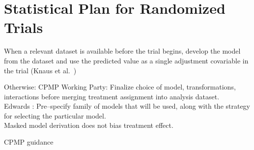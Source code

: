\section{Statistical Plan for Randomized Trials}
\bi
\item   When a relevant dataset is available before the trial begins, develop the model from the dataset and use the predicted value as a single adjustment covariable in the trial (Knaus et al.~\cite{kna93cli})
\item   Otherwise: CPMP Working Party: Finalize choice of model, transformations, interactions before merging treatment assignment into analysis dataset. \\
        Edwards \cite{edw99mod}: Pre--specify family of models that will be used, along with the strategy for selecting the particular model. \\
        Masked model derivation does not bias treatment effect.
\item CPMP guidance~\cite{cpmp04poi}
